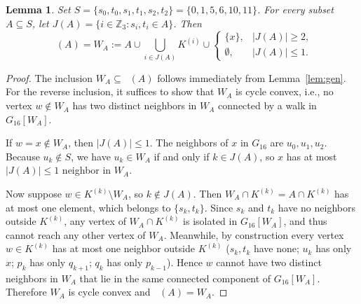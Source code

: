 \documentclass[11pt,a4paper]{article}
\newtheorem{lemma}[theorem]{Lemma}
\DeclareMathOperator{\Hull}{Hull_{cc}}
\begin{document}
\begin{lemma}\label{lem:hullS}
Set $S = \{s_0, t_0, s_1, t_1, s_2, t_2\} = \{0, 1, 5, 6, 10, 11\}$. For every subset $A \subseteq S$, let $J(A) = \{i \in \mathbb{Z}_3 : s_i, t_i \in A\}$. Then
\[
\Hull(A) = W_A := A \cup \bigcup_{i \in J(A)} K^{(i)} \cup \begin{cases} \{x\}, & |J(A)| \ge 2, \\ \emptyset, & |J(A)| \le 1. \end{cases}
\]
\end{lemma}

\begin{proof}
The inclusion $W_A \subseteq \Hull(A)$ follows immediately from Lemma~\ref{lem:gen}. For the reverse inclusion, it suffices to show that $W_A$ is cycle convex, i.e., no vertex $w \notin W_A$ has two distinct neighbors in $W_A$ connected by a walk in $G_{16}[W_A]$.

If $w = x \notin W_A$, then $|J(A)| \le 1$. The neighbors of $x$ in $G_{16}$ are $u_0, u_1, u_2$. Because $u_k \notin S$, we have $u_k \in W_A$ if and only if $k \in J(A)$, so $x$ has at most $|J(A)| \le 1$ neighbor in $W_A$.

Now suppose $w \in K^{(k)} \setminus W_A$, so $k \notin J(A)$. Then $W_A \cap K^{(k)} = A \cap K^{(k)}$ has at most one element, which belongs to $\{s_k, t_k\}$. Since $s_k$ and $t_k$ have no neighbors outside $K^{(k)}$, any vertex of $W_A \cap K^{(k)}$ is isolated in $G_{16}[W_A]$, and thus cannot reach any other vertex of $W_A$. Meanwhile, by construction every vertex $w \in K^{(k)}$ has at most one neighbor outside $K^{(k)}$ ($s_k, t_k$ have none; $u_k$ has only $x$; $p_k$ has only $q_{k+1}$; $q_k$ has only $p_{k-1}$). Hence $w$ cannot have two distinct neighbors in $W_A$ that lie in the same connected component of $G_{16}[W_A]$. Therefore $W_A$ is cycle convex and $\Hull(A) = W_A$.
\end{proof}
\end{document}
